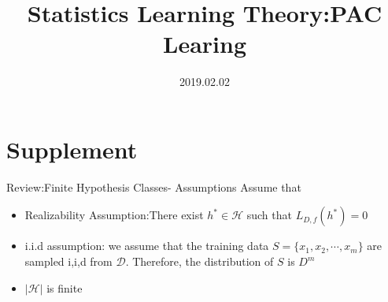 \documentclass{beamer}
\title[Introduction]{Statistics Learning Theory:PAC Learing}
\author{}
\institute{}
\date{2019.02.02}
\begin{document}
\begin{frame}
  \titlepage
\end{frame}


\section{Supplement}

\begin{frame}{Review:Finite Hypothesis Classes- Assumptions}
Assume that 
\begin{itemize}
	\item Realizability Assumption:There exist $h^* \in \mathcal{H}$ such that $L_{D,f}(h^*)=0$
	\item i.i.d assumption: we assume that the training data $S = \{x_1,x_2, \cdots,x_m\}$ are sampled i,i,d from $\mathcal{D}$. Therefore, the distribution of $S$ is $D^m$
	\item $ |\mathcal{H}|$ is finite
\end{itemize}

\end{frame}
\end{document}
